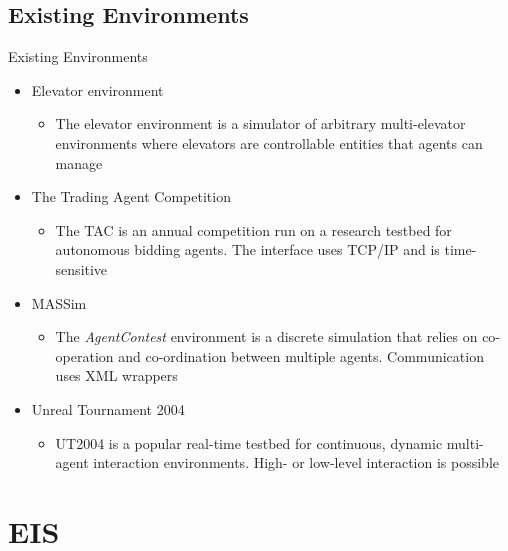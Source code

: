 \documentclass[t]{beamer}
\begin{document}
\subsection{Existing Environments}
\begin{frame}{Existing Environments}
\begin{itemize}
	\item<1-> Elevator environment
	\begin{itemize}
		\item[] The elevator environment is a simulator of arbitrary multi-elevator environments where elevators are controllable entities that agents can manage
	\end{itemize}
	\item<2-> The Trading Agent Competition
	\begin{itemize}
		\item[] The TAC is an annual competition run on a research testbed for autonomous bidding agents. The interface uses TCP/IP and is time-sensitive
	\end{itemize}
	\item<3-> MASSim
	\begin{itemize}
		\item[] The \textit{AgentContest} environment is a discrete simulation that relies on co-operation and co-ordination between multiple agents. Communication uses XML wrappers
	\end{itemize}
	\item<4-> Unreal Tournament 2004
	\begin{itemize}
		\item[] UT2004 is a popular real-time testbed for continuous, dynamic multi-agent interaction environments. High- or low-level interaction is possible
	\end{itemize}
\end{itemize}
\end{frame}
\section{EIS}
\end{document}
